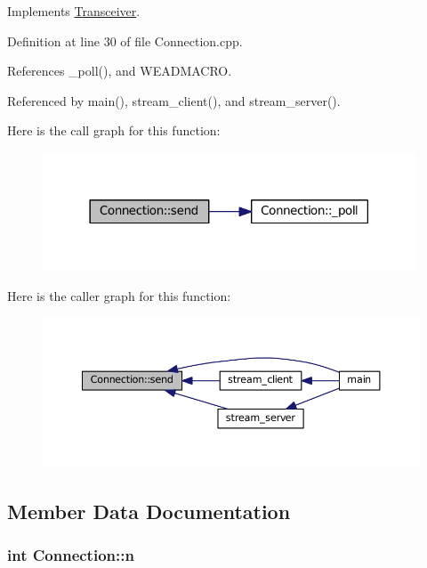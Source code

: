 Implements \hyperlink{classTransceiver_aa54935e0032d9ab6c531024e001ae19d}{Transceiver}.



Definition at line 30 of file Connection.\+cpp.



References \+\_\+poll(), and W\+E\+A\+D\+M\+A\+C\+R\+O.



Referenced by main(), stream\+\_\+client(), and stream\+\_\+server().



Here is the call graph for this function\+:
\nopagebreak
\begin{figure}[H]
\begin{center}
\leavevmode
\includegraphics[width=314pt]{classConnection_a5466a66e569e81d891559686f2c7594b_cgraph}
\end{center}
\end{figure}




Here is the caller graph for this function\+:
\nopagebreak
\begin{figure}[H]
\begin{center}
\leavevmode
\includegraphics[width=350pt]{classConnection_a5466a66e569e81d891559686f2c7594b_icgraph}
\end{center}
\end{figure}




\subsection{Member Data Documentation}
\hypertarget{classConnection_af54be737cc02308299c2e80a893a3e46}{
\subsubsection[{n}]{\setlength{\rightskip}{0pt plus 5cm}int Connection\+::n\hspace{0.3cm}{\ttfamily [private]}}}\label{classConnection_af54be737cc02308299c2e80a893a3e46}


